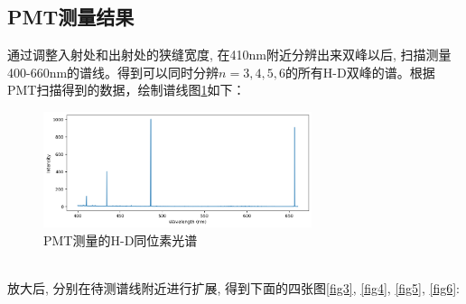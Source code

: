 \documentclass[12pt,a4paper]{article}
\begin{document}
\subsection{PMT测量结果}
通过调整入射处和出射处的狭缝宽度, 在410nm附近分辨出来双峰以后, 扫描测量400-660nm的谱线。得到可以同时分辨$n=3,4,5,6$的所有H-D双峰的谱。根据PMT扫描得到的数据，绘制谱线图\ref{fig2}如下：
\begin{figure}[htbp]
    \centering
    \includegraphics[width=0.7\textwidth]{PMT.png}
    \caption{PMT测量的H-D同位素光谱}
    \label{fig2}
\end{figure}
\\
放大后, 分别在待测谱线附近进行扩展, 得到下面的四张图\ref{fig3}, \ref{fig4}, \ref{fig5}, \ref{fig6}:
\end{document}

